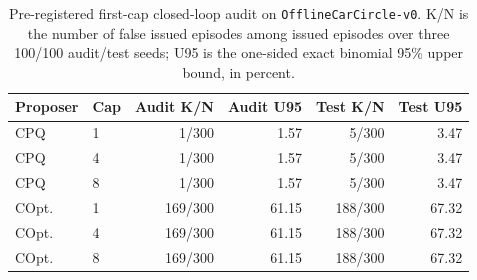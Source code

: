 \begin{table}[t]
\centering
\scriptsize
\setlength{\tabcolsep}{3pt}
\begin{tabular}{llrrrr}
\toprule
Proposer & Cap & Audit K/N & Audit U95 & Test K/N & Test U95 \\
\midrule
CPQ & 1 & 1/300 & 1.57 & 5/300 & 3.47 \\
CPQ & 4 & 1/300 & 1.57 & 5/300 & 3.47 \\
CPQ & 8 & 1/300 & 1.57 & 5/300 & 3.47 \\
\midrule
COpt. & 1 & 169/300 & 61.15 & 188/300 & 67.32 \\
COpt. & 4 & 169/300 & 61.15 & 188/300 & 67.32 \\
COpt. & 8 & 169/300 & 61.15 & 188/300 & 67.32 \\
\bottomrule
\end{tabular}
\caption{Pre-registered first-cap closed-loop audit on \texttt{OfflineCarCircle-v0}. K/N is the number of false issued episodes among issued episodes over three 100/100 audit/test seeds; U95 is the one-sided exact binomial 95\% upper bound, in percent.}
\label{tab:first-cap-closed-loop}
\end{table}
